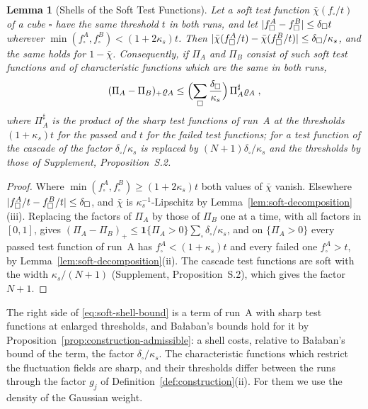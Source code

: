 \documentclass[11pt]{preprint}
\DeclarePairedDelimiter{\abs}{\lvert}{\rvert}
\numberwithin{equation}{section}
\newtheorem{lemma}[theorem]{Lemma}
\theoremstyle{definition}
\theoremstyle{remark}
\theoremstyle{plain}
\begin{document}
\begin{lemma}[Shells of the Soft Test Functions]\label{lem:soft-shells}
Let a soft test function $\bar\chi(f_\square/t)$ of a cube $\square$ have the same threshold $t$ in both runs, and let $\abs{f^A_\square - f^B_\square} \leq \delta_\square t$ wherever $\min(f^A_\square, f^B_\square) < (1 + 2\kappa_s)t$. Then $\abs{\bar\chi(f^A_\square/t) - \bar\chi(f^B_\square/t)} \leq \delta_\square/\kappa_s$, and the same holds for $1 - \bar\chi$. Consequently, if $\Pi_A$ and $\Pi_B$ consist of such soft test functions and of characteristic functions which are the same in both runs,
\begin{equation}\label{eq:soft-shell-bound}
    (\Pi_A - \Pi_B)_+\varrho_A \leq \Bigl(\sum_\square\frac{\delta_\square}{\kappa_s}\Bigr)\,\Pi^{\sharp}_A\varrho_A\;,
\end{equation}
where $\Pi^\sharp_A$ is the product of the sharp test functions of run~A at the thresholds $(1 + \kappa_s)t$ for the passed and $t$ for the failed test functions; for a test function of the cascade of \cite[(1.22)--(1.24), p.~181]{BalabanLFR1} the factor $\delta_\square/\kappa_s$ is replaced by $(N + 1)\delta_\square/\kappa_s$ and the thresholds by those of Supplement, Proposition~S.2.
\end{lemma}

\begin{proof}
Where $\min(f^A_\square, f^B_\square) \geq (1 + 2\kappa_s)t$ both values of $\bar\chi$ vanish. Elsewhere $\abs{f^A_\square/t - f^B_\square/t} \leq \delta_\square$, and $\bar\chi$ is $\kappa_s^{-1}$-Lipschitz by Lemma~\ref{lem:soft-decomposition}(iii). Replacing the factors of $\Pi_A$ by those of $\Pi_B$ one at a time, with all factors in $[0, 1]$, gives $(\Pi_A - \Pi_B)_+ \leq \mathbf 1\{\Pi_A > 0\}\sum_\square\delta_\square/\kappa_s$, and on $\{\Pi_A > 0\}$ every passed test function of run~A has $f^A_\square < (1 + \kappa_s)t$ and every failed one $f^A_\square > t$, by Lemma~\ref{lem:soft-decomposition}(ii). The cascade test functions are soft with the width $\kappa_s/(N + 1)$ (Supplement, Proposition~S.2), which gives the factor $N + 1$.
\end{proof}

The right side of \eqref{eq:soft-shell-bound} is a term of run~A with sharp test functions at enlarged thresholds, and Ba{\l}aban's bounds hold for it by Proposition~\ref{prop:construction-admissible}: a shell costs, relative to Ba{\l}aban's bound of the term, the factor $\delta_\square/\kappa_s$. The characteristic functions which restrict the fluctuation fields are sharp, and their thresholds differ between the runs through the factor $g_j$ of Definition~\ref{def:construction}(ii). For them we use the density of the Gaussian weight.
\end{document}
